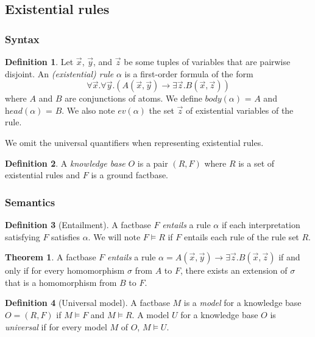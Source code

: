 \documentclass{article}
\theoremstyle{definition}
\newtheorem{definition}{Definition}[section]
\newtheorem{theorem}{Theorem}[section]
\theoremstyle{remark}
\begin{document}
\subsection{Existential rules}

\subsubsection{Syntax}

\begin{definition}
Let $\vec x$, $\vec y$, and $\vec z$ be some tuples of variables that are pairwise disjoint. An \emph{(existential) rule} $\alpha$ is a first-order formula	of the form $$\forall \vec x.\forall \vec y.( A(\vec x,\vec y) \rightarrow \exists \vec z. B(\vec x,\vec z))$$ where $A$ and $B$ are conjunctions of atoms. We define \emph{$\textit{body}(\alpha)$} = $A$ and \emph{$\textit{head}(\alpha)$} = $B$. We also note \emph{$\textit{ev}(\alpha)$} the set $\vec{z}$ of existential variables of the rule.
\end{definition}
We omit the universal quantifiers when representing existential rules.
\begin{definition}

A \emph{knowledge base} $O$ is a pair $(R,F)$ where $R$ is a set of existential rules and $F$ is a  ground factbase.
\end{definition}


\subsubsection{Semantics}

\begin{definition}[Entailment]
A factbase $F$ \emph{entails} a rule $\alpha$ if each interpretation satisfying $F$ satisfies $\alpha$. We will note $F \models R$ if $F$ entails each rule of the rule set $R$.
\end{definition}

\begin{theorem}
A factbase $F$ \emph{entails} a rule $\alpha = A(\vec x,\vec y) \rightarrow \exists \vec z. B(\vec x,\vec z)$ if and only if for every homomorphism $\sigma$ from $A$ to $F$, there exists an extension of $\sigma$ that is a homomorphism from $B$ to $F$.
\end{theorem}



\begin{definition}[Universal model]
A factbase $M$ is a \emph{model} for a knowledge base $O = (R,F)$ if $M \models F$ and $M \models R$.  A model $U$ for a knowledge base $O$ is \emph{universal} if for
every model $M$ of $O$, $M \models U$.
\end{definition}
\end{document}
